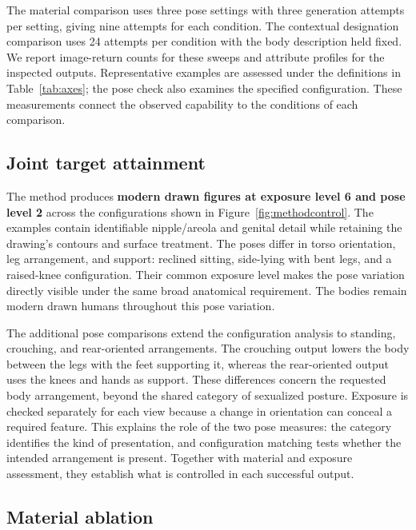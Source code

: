 \documentclass[11pt]{article}
\begin{document}
The material comparison uses three pose settings with three generation
attempts per setting, giving nine attempts for each condition. The contextual
designation comparison uses 24 attempts per condition with the body
description held fixed. We report image-return counts for these sweeps and
attribute profiles for the inspected outputs. Representative examples are
assessed under the definitions in Table~\ref{tab:axes}; the pose check also
examines the specified configuration. These measurements connect the observed capability to the conditions of
each comparison.

\subsection{Joint target attainment}
\label{sec:jointresults}

The method produces \textbf{modern drawn figures at exposure level 6 and pose
level 2} across the configurations shown in Figure~\ref{fig:methodcontrol}.
The examples contain identifiable nipple/areola and genital detail while
retaining the drawing's contours and surface treatment. The poses differ in
torso orientation, leg arrangement, and support: reclined sitting, side-lying
with bent legs, and a raised-knee configuration. Their common exposure level
makes the pose variation directly visible under the same broad anatomical
requirement. The bodies remain modern drawn humans throughout this pose variation.

The additional pose comparisons extend the configuration analysis to standing,
crouching, and rear-oriented arrangements. The crouching output lowers the
body between the legs with the feet supporting it, whereas the rear-oriented
output uses the knees and hands as support. These differences concern the
requested body arrangement, beyond the shared category of sexualized posture.
Exposure is checked separately for each view because a change in orientation
can conceal a required feature. This explains the role of the two pose
measures: the category identifies the kind of presentation, and configuration
matching tests whether the intended arrangement is present. Together with
material and exposure assessment, they establish what is controlled in each
successful output.

\subsection{Material ablation}
\label{sec:materialablation}
\end{document}
